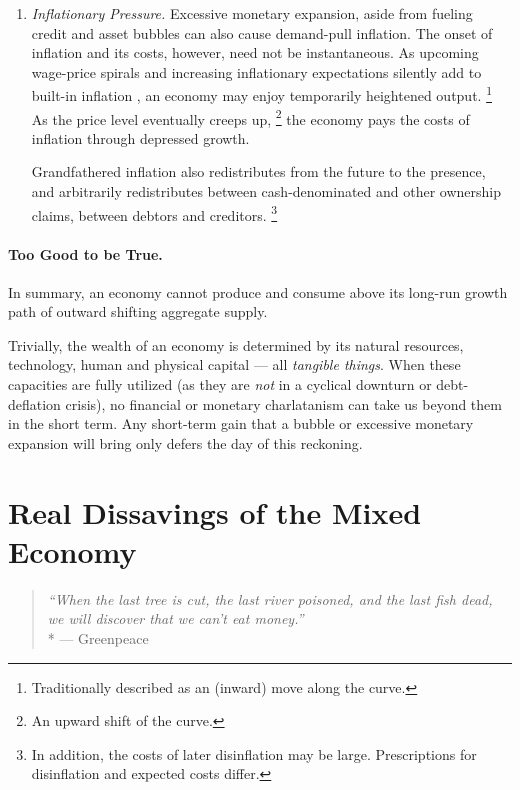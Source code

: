 \begin{enumerate}
	\item {} \label{itm:inflationary-pressure} \emph{Inflationary Pressure.} Excessive monetary expansion, aside from fueling credit and asset bubbles can also cause demand-pull inflation.
The onset of inflation and its costs, however, need not be instantaneous.
As upcoming wage-price spirals and increasing inflationary expectations silently add to built-in inflation \citep{Gordon1988}, an economy may enjoy temporarily  heightened output.
	\footnote{
		Traditionally described as an (inward) move along the \cite{Phillips1958} curve.
	}
	As the price level eventually creeps up,
	\footnote{
		An upward shift of the \cite{Phillips1958} curve.
	}
	the economy pays the costs of inflation through depressed growth.

	Grandfathered inflation also redistributes from the future to the presence, and arbitrarily redistributes between cash-denominated and other ownership claims, between debtors and creditors.
	\footnote{
		In addition, the costs of later disinflation may be large.
		Prescriptions for disinflation and expected costs differ.
	}
\end{enumerate}

\paragraph[Too Good To Be True]{Too Good to be True.}
In summary, an economy cannot produce and consume above its long-run growth path of outward shifting aggregate supply.

Trivially, the wealth of an economy is determined by its natural resources, technology, human and physical capital --- all \emph{tangible things}.
When these capacities are fully utilized (as they are \emph{not} in a cyclical downturn or debt-deflation crisis), no financial or monetary charlatanism can take us beyond them in the short term.
Any short-term gain that a bubble or excessive monetary expansion will bring only defers the day of this reckoning.

\section[Real Dissavings]{Real Dissavings of the Mixed Economy} \label{sec:real-dissavings}

\begin{quote}
	\emph{``When the last tree is cut, the last river poisoned, and the last fish dead, we will discover that we can't eat money.''}
	\\*
	--- Greenpeace
\end{quote}


